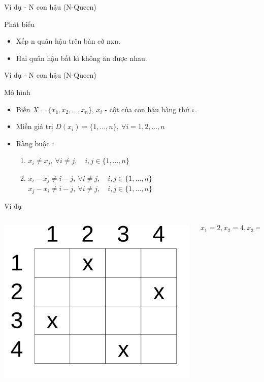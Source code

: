 \documentclass[compress]{beamer}
\begin{document}
\begin{frame}{Ví dụ - N con hậu (N-Queen)}
\begin{exampleblock}{Phát biểu}
\begin{itemize}
\item Xếp n quân hậu trên bàn cờ nxn.
\item Hai quân hậu bất kì không ăn được nhau. 
\end{itemize}
\end{exampleblock}
\end{frame}
\begin{frame}{Ví dụ - N con hậu (N-Queen)}
\begin{block}{Mô hình}
\begin{itemize}
\item Biến $X=\{x_1, x_2, \dots,x_n\}$, $x_i$ - cột của con hậu hàng thứ $i$.
\item Miền giá trị $D(x_i)=\{1,\ldots,n\}, \ \forall i=1,2,\dots,n$
\item Ràng buộc :
\begin{enumerate}


\item 
$ x_i \neq x_j, \ \forall i \neq j, \quad i,j \in \{1,\dots,n\} $
\item 
$x_i-x_j \neq i-j , \ \forall i \neq j, \quad i,j \in \{1,\dots,n\}$
$x_j-x_i \neq i-j, \ \forall i \neq j, \quad i,j \in \{1,\dots,n\}$
\end{enumerate}
\end{itemize}
\end{block}
\begin{exampleblock}{Ví dụ}

\begin{columns}
\begin{column}{0.3\textwidth}
  \includegraphics[scale=0.2]{n-queen.png}
\end{column}
\begin{column}{0.7\textwidth}  
     $$x_1=2,x_2=4,x_3=1,x_4=3$$
\end{column}
\end{columns}
\end{exampleblock}
\end{frame}
\end{document}
